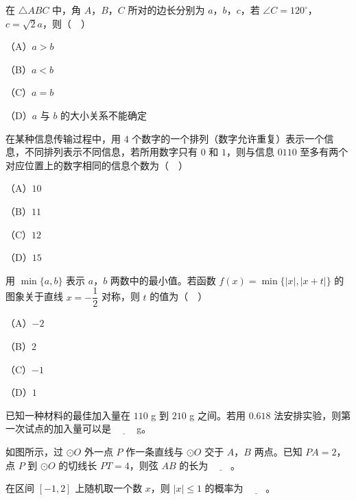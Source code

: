 \begin{question}
在 $\triangle ABC$ 中，角 $A$，$B$，$C$ 所对的边长分别为 $a$，$b$，$c$，若 $\angle C=120^\circ$，$c=\sqrt2a$，则（　）

（A）$a>b$

（B）$a<b$

（C）$a=b$

（D）$a$ 与 $b$ 的大小关系不能确定

\end{question}
\begin{question}
在某种信息传输过程中，用 $4$ 个数字的一个排列（数字允许重复）表示一个信息，不同排列表示不同信息，若所用数字只有 $0$ 和 $1$，则与信息 $0110$ 至多有两个对应位置上的数字相同的信息个数为（　）

（A）$10$

（B）$11$

（C）$12$

（D）$15$

\end{question}
\begin{question}
用 $\min\{a,b\}$ 表示 $a$，$b$ 两数中的最小值。若函数 $f(x)=\min\{|x|,|x+t|\}$ 的图象关于直线 $x=-\dfrac12$ 对称，则 $t$ 的值为（　）

（A）$-2$

（B）$2$

（C）$-1$

（D）$1$

\end{question}
\begin{question}
已知一种材料的最佳加入量在 $110$ g 到 $210$ g 之间。若用 $0.618$ 法安排实验，则第一次试点的加入量可以是 $\underline{\qquad}$ g。

\Needspace{0.4\textheight}
\end{question}
\begingroup
\renewenvironment{question}{\Needspace{0.5\textheight}}{}
\begin{question}
如图所示，过 $\odot O$ 外一点 $P$ 作一条直线与 $\odot O$ 交于 $A$，$B$ 两点。已知 $PA=2$，点 $P$ 到 $\odot O$ 的切线长 $PT=4$，则弦 $AB$ 的长为 $\underline{\qquad}$。
\nopagebreak[4]
\begin{center}\end{center}
\nopagebreak[4]
\end{question}
\endgroup
\begin{question}
在区间 $[-1,2]$ 上随机取一个数 $x$，则 $|x|\leqslant1$ 的概率为 $\underline{\qquad}$。

\Needspace{0.4\textheight}
\end{question}
